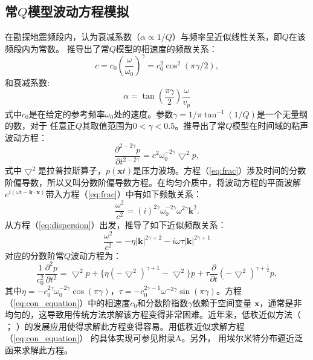 \subsection{常$Q$模型波动方程模拟}
在勘探地震频段内，认为衰减系数（$\alpha\propto 1/Q$）与频率呈近似线性关系，即$Q$在该频段内为常数。
 推导出了常$Q$模型的相速度的频散关系：
\begin{equation}
	c=c_0(\frac{\omega}{\omega_0})^\gamma=c_0^2\cos^2(\pi\gamma/2),
\end{equation}
和衰减系数:
\begin{equation}
	\alpha=\tan(\frac{\pi\gamma}{2})\frac{\omega}{v_p}
\end{equation}
式中$c_0$是在给定的参考频率$\omega_0$处的速度。参数$\gamma=1/\pi\tan^{-1}(1/Q)$是一个无量纲的数，对于
任意正$Q$其取值范围为$0<\gamma<0.5$。推导出了常$Q$模型在时间域的粘声波动方程：
\begin{equation}
	\frac{\partial^{2-2\gamma}p}{\partial t^{2-2\gamma}}=c^2\omega_0^{-2\gamma}\bigtriangledown^2p,
	\label{eq:frac}
\end{equation}
式中$\bigtriangledown^2$是拉普拉斯算子，$p(\mathbf{x}t)$是压力波场。方程（\ref{eq:frac}）涉及时间的分数
阶偏导数，所以又叫分数阶偏导数方程。在均匀介质中，将波动方程的平面波解
$e^{i(\omega t-\mathbf{k}\cdot\mathbf{x})}$带入方程（\ref{eq:frac}）中有如下频散关系：
\begin{equation}
	\frac{\omega^2}{c^2}=(i)^{2\gamma}\omega_0^{-2\gamma}\omega^{2\gamma}\mathbf{k}^2.
	\label{eq:dispersion}
\end{equation}
 从方程（\ref{eq:dispersion}）出发，推导了如下近似频散关系：
\begin{equation}
	\frac{\omega^2}{c^2}=-\eta|\mathbf{k}|^{2\gamma+2}-i\omega\tau|\mathbf{k}|^{2\gamma+1}
	\label{eq:dispersion1}
\end{equation}
对应的分数阶常$Q$波动方程为：
\begin{equation}
	\frac{1}{c_0^2}\frac{\partial^2p}{\partial t^2}=\bigtriangledown^2p + \{\eta(-\bigtriangledown^2)^
	{\gamma+1}-\bigtriangledown^2\}p + \tau\frac{\partial}{\partial t}(-\bigtriangledown^2)^{\gamma+
	\frac{1}{2}}p,
	\label{eq:con_equation}
\end{equation}
其中$\eta=-c_0^{2\gamma}\omega_0^{-2\gamma}\cos(\pi\gamma)$，$\tau=-c_0^{2\gamma-1}\omega^{-2\gamma}
\sin(\pi\gamma)$。方程（\ref{eq:con_equation}）中的相速度$c_0$和分数阶指数$\gamma$依赖于空间变量
$\mathbf{x}$，通常是非均匀的，这导致用传统方法求解该方程变得非常困难。近年来，低秩近似方法（ 
； ）的发展应用使得求解此方程变得容易。用低秩近似求解方程（\ref{eq:con_equation}）
的具体实现可参见附录A。另外， 用埃尔米特分布逼近泛函来求解此方程。


